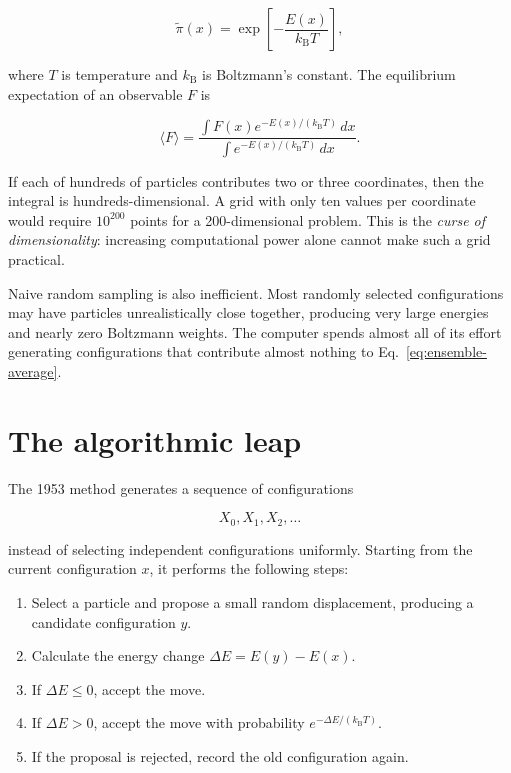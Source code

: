 \documentclass[11pt]{article}
\begin{document}
\begin{equation}
  \widetilde{\pi}(x)=\exp\!\left[-\frac{E(x)}{k_{\mathrm B}T}\right],
\end{equation}

where $T$ is temperature and $k_{\mathrm B}$ is Boltzmann's constant. The
equilibrium expectation of an observable $F$ is

\begin{equation}
 \langle F\rangle =
 \frac{\displaystyle\int F(x)e^{-E(x)/(k_{\mathrm B}T)}\,dx}
      {\displaystyle\int e^{-E(x)/(k_{\mathrm B}T)}\,dx}.
 \label{eq:ensemble-average}
\end{equation}

If each of hundreds of particles contributes two or three coordinates, then
the integral is hundreds-dimensional. A grid with only ten values per coordinate
would require $10^{200}$ points for a 200-dimensional problem. This is the
\emph{curse of dimensionality}: increasing computational power alone cannot make
such a grid practical.

Naive random sampling is also inefficient. Most randomly selected configurations
may have particles unrealistically close together, producing very large energies
and nearly zero Boltzmann weights. The computer spends almost all of its effort
generating configurations that contribute almost nothing to
Eq.~\eqref{eq:ensemble-average}.

\section{The algorithmic leap}

The 1953 method generates a sequence of configurations

\[
 X_0,X_1,X_2,\ldots
\]

instead of selecting independent configurations uniformly. Starting from the
current configuration $x$, it performs the following steps:

\begin{enumerate}
  \item Select a particle and propose a small random displacement, producing a
        candidate configuration $y$.
  \item Calculate the energy change $\Delta E=E(y)-E(x)$.
  \item If $\Delta E\leq 0$, accept the move.
  \item If $\Delta E>0$, accept the move with probability
        $e^{-\Delta E/(k_{\mathrm B}T)}$.
  \item If the proposal is rejected, record the old configuration again.
\end{enumerate}
\end{document}
